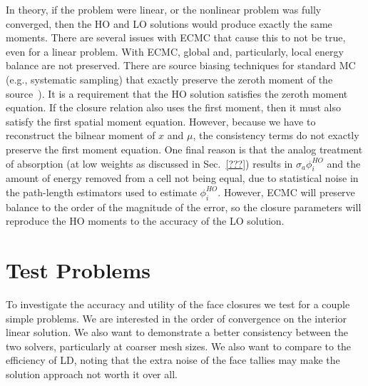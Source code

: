 In theory, if the problem were linear, or the nonlinear problem was fully converged,
then the HO and LO solutions would produce exactly the same moments.  There are
several issues with ECMC that cause this to not be true, even for a linear problem.
With ECMC, global and, particularly, local energy balance are not preserved.  There
are source biasing techniques for standard MC (e.g., systematic
sampling) that exactly preserve the zeroth moment of the source~\cite{shultis_mc}). 
It is a requirement that the HO solution satisfies the zeroth moment equation. If the
closure relation also uses the first moment, then it must also satisfy the first
spatial moment equation.  However, because we have to reconstruct the bilnear moment
of $x$ and $\mu$, the consistency terms do not exactly preserve the first moment
equation.  One final reason is that the analog treatment of absorption (at low
weights as discussed in Sec.~\ref{???}) results in $\sigma_a \phi^{HO}_i$ and the amount
of energy removed from a cell not being equal, due to statistical noise in the
path-length estimators used to estimate $\phi^{HO}_i$.  However, ECMC will preserve
balance to the order of the magnitude of the error, so the closure parameters will
reproduce the HO moments to the accuracy of the LO solution.

\section{Test Problems}

To investigate the accuracy and utility of the face closures we test for a couple simple
problems.  We are interested in the order of convergence on the interior linear solution.
We also want to demonstrate a better consistency between the two solvers, particularly at
coarser mesh sizes.  We also want to compare to the efficiency of LD, noting that the
extra noise of the face tallies may make the solution approach not worth it over all.

